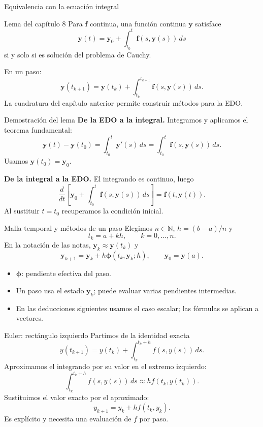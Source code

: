 \documentclass[aspectratio=169,12pt]{beamer}
\begin{document}
\begin{frame}{Equivalencia con la ecuación integral}
\begin{block}{Lema del capítulo 8}
Para $\mathbf f$ continua, una función continua $\mathbf y$ satisface
\[\mathbf y(t)=\mathbf y_0+\int_{t_0}^t\mathbf f(s,\mathbf y(s))\,ds\]
si y solo si es solución del problema de Cauchy.
\end{block}
En un paso:
\[\boxed{\mathbf y(t_{k+1})=\mathbf y(t_k)+
\int_{t_k}^{t_{k+1}}\mathbf f(s,\mathbf y(s))\,ds.}\]
La cuadratura del capítulo anterior permite construir métodos para la EDO.
\end{frame}

\begin{frame}{Demostración del lema}
\textbf{De la EDO a la integral.} Integramos y aplicamos el teorema fundamental:
\[\mathbf y(t)-\mathbf y(t_0)=\int_{t_0}^t\mathbf y'(s)\,ds
=\int_{t_0}^t\mathbf f(s,\mathbf y(s))\,ds.\]
Usamos $\mathbf y(t_0)=\mathbf y_0$.
\medskip

\textbf{De la integral a la EDO.} El integrando es continuo, luego
\[\frac{d}{dt}\left[\mathbf y_0+\int_{t_0}^t\mathbf f(s,\mathbf y(s))\,ds\right]
=\mathbf f(t,\mathbf y(t)).\]
Al sustituir $t=t_0$ recuperamos la condición inicial.
\end{frame}

\begin{frame}{Malla temporal y métodos de un paso}
Elegimos $n\in\mathbb N$, $h=(b-a)/n$ y
\[t_k=a+kh,\qquad k=0,\ldots,n.\]
En la notación de las notas, $\mathbf y_k\approx\mathbf y(t_k)$ y
\[\boxed{\mathbf y_{k+1}=\mathbf y_k+
h\boldsymbol\phi(t_k,\mathbf y_k;h),\qquad \mathbf y_0=\mathbf y(a).}\]
\begin{itemize}
\item $\boldsymbol\phi$: pendiente efectiva del paso.
\item Un paso usa el estado $\mathbf y_k$; puede evaluar varias pendientes intermedias.
\item En las deducciones siguientes usamos el caso escalar; las fórmulas se aplican a vectores.
\end{itemize}
\end{frame}

\begin{frame}{Euler: rectángulo izquierdo}
Partimos de la identidad exacta
\[y(t_{k+1})=y(t_k)+\int_{t_k}^{t_k+h}f(s,y(s))\,ds.\]
Aproximamos el integrando por su valor en el extremo izquierdo:
\[\int_{t_k}^{t_k+h}f(s,y(s))\,ds\approx h f(t_k,y(t_k)).\]
Sustituimos el valor exacto por el aproximado:
\[\boxed{y_{k+1}=y_k+h f(t_k,y_k).}\]
Es explícito y necesita una evaluación de $f$ por paso.
\end{frame}
\end{document}
